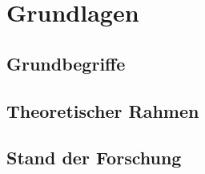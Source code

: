 \section{Grundlagen}
\label{sec:grundlagen}


\subsection{Grundbegriffe}
\label{subsec:grundbegriffe}


\subsection{Theoretischer Rahmen}
\label{subsec:theorie}


\subsection{Stand der Forschung}
\label{subsec:forschungsstand}

